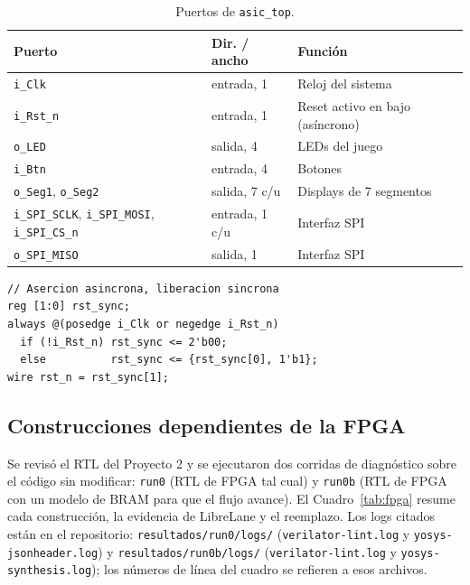\documentclass[11pt,letterpaper]{article}
\newcommand{\code}[1]{\texttt{#1}}
\newcommand{\fuente}{\par\vspace{3pt}{\footnotesize\emph{Fuente: Elaboración propia.}}\par}
\begin{document}
\begin{table}[H]
\centering
\caption{Puertos de \code{asic\_top}.}
\label{tab:puertos}
\begin{tabular}{llp{6.5cm}}
\toprule
\textbf{Puerto} & \textbf{Dir. / ancho} & \textbf{Función}\\
\midrule
\code{i\_Clk} & entrada, 1 & Reloj del sistema\\
\code{i\_Rst\_n} & entrada, 1 & Reset activo en bajo (asíncrono)\\
\code{o\_LED} & salida, 4 & LEDs del juego\\
\code{i\_Btn} & entrada, 4 & Botones\\
\code{o\_Seg1}, \code{o\_Seg2} & salida, 7 c/u & Displays de 7 segmentos\\
\code{i\_SPI\_SCLK}, \code{i\_SPI\_MOSI}, \code{i\_SPI\_CS\_n} & entrada, 1 c/u & Interfaz SPI\\
\code{o\_SPI\_MISO} & salida, 1 & Interfaz SPI\\
\bottomrule
\end{tabular}
\fuente
\end{table}

\begin{samepage}
\begin{lstlisting}[language=verilogx,caption={Sincronizador de reset en \code{asic\_top} (extracto).},label={lst:rstsync}]
// Asercion asincrona, liberacion sincrona
reg [1:0] rst_sync;
always @(posedge i_Clk or negedge i_Rst_n)
  if (!i_Rst_n) rst_sync <= 2'b00;
  else          rst_sync <= {rst_sync[0], 1'b1};
wire rst_n = rst_sync[1];
\end{lstlisting}
\end{samepage}

\subsection{Construcciones dependientes de la FPGA}

Se revisó el RTL del Proyecto 2 y se ejecutaron dos corridas de diagnóstico sobre el código sin modificar: \code{run0} (RTL de FPGA tal cual) y \code{run0b} (RTL de FPGA con un modelo de BRAM para que el flujo avance). El Cuadro~\ref{tab:fpga} resume cada construcción, la evidencia de LibreLane y el reemplazo. Los logs citados están en el repositorio: \code{resultados/}\allowbreak\code{run0/}\allowbreak\code{logs/} (\code{verilator-}\allowbreak\code{lint.log} y \code{yosys-}\allowbreak\code{jsonheader.log}) y \code{resultados/}\allowbreak\code{run0b/}\allowbreak\code{logs/} (\code{verilator-}\allowbreak\code{lint.log} y \code{yosys-}\allowbreak\code{synthesis.log}); los números de línea del cuadro se refieren a esos archivos.
\end{document}
